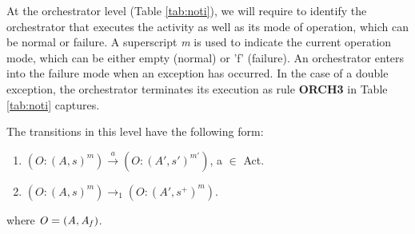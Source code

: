 At the orchestrator level (Table \ref{tab:noti}), we will require to identify the orchestrator that executes the activity as well as its mode of operation, which can be normal or failure. A superscript {\it m} is used to indicate the current operation mode, which can be either empty (normal) or 'f' (failure). An orchestrator enters into the failure mode when an exception has occurred. In the case of a double exception, the orchestrator terminates its execution as rule {\bf ORCH3} in Table \ref{tab:noti} captures.
\begin{definition}
The transitions in this level have the following form:

\begin{enumerate}
\item \hspace{0.1cm}$(O:(A,s)^{m})\xrightarrow{a}(O:(A',s')^{m'})$, a $\in$ Act. %
\item \hspace{0.1cm}$(O:(A,s)^{m})\xrightarrow{}_1(O:(A',s^+)^{m})$. %
\end{enumerate}
where ${\it O= (A,A_f)}$.
\vspace{-0.4cm}
\end{definition}
\vspace{0.2cm}
